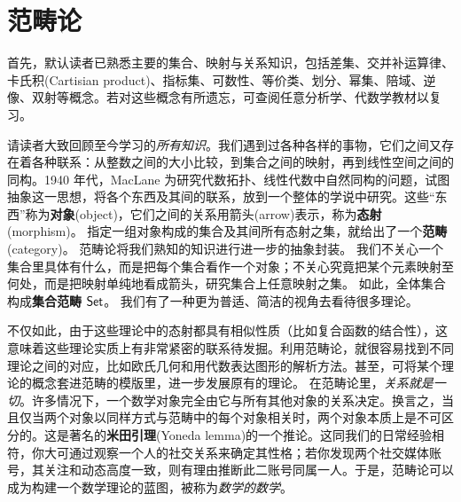 \chapter{范畴论}\label{appx:cat}
首先，默认读者已熟悉主要的集合、映射与关系知识，包括差集、交并补运算律、卡氏积(Cartisian product)、指标集、可数性、等价类、划分、幂集、陪域、逆像、双射等概念。若对这些概念有所遗忘，可查阅任意分析学、代数学教材以复习。

请读者大致回顾至今学习的\textit{所有知识}。我们遇到过各种各样的事物，它们之间又存在着各种联系：从整数之间的大小比较，到集合之间的映射，再到线性空间之间的同构。1940 年代，MacLane 为研究代数拓扑、线性代数中自然同构的问题，试图抽象这一思想，将各个东西及其间的联系，放到一个整体的学说中研究。这些“东西”称为\textbf{对象}(object)，它们之间的关系用箭头(arrow)表示，称为\textbf{态射}(morphism)。
指定一组对象构成的集合及其间所有态射之集，就给出了一个\textbf{范畴}(category)。
范畴论将我们熟知的知识进行进一步的抽象封装。
我们不关心一个集合里具体有什么，而是把每个集合看作一个对象；不关心究竟把某个元素映射至何处，而是把映射单纯地看成箭头，研究集合上任意映射之集。
如此，全体集合构成\textbf{集合范畴} $\mathsf{Set}$。
我们有了一种更为普适、简洁的视角去看待很多理论。

不仅如此，由于这些理论中的态射都具有相似性质（比如复合函数的结合性），这意味着这些理论实质上有非常紧密的联系待发掘。利用范畴论，就很容易找到不同理论之间的对应，比如欧氏几何和用代数表达图形的解析方法。甚至，可将某个理论的概念套进范畴的模版里，进一步发展原有的理论。
在范畴论里，\textit{关系就是一切}。许多情况下，一个数学对象完全由它与所有其他对象的关系决定。换言之，当且仅当两个对象以同样方式与范畴中的每个对象相关时，两个对象本质上是不可区分的。这是著名的\textbf{米田引理}(Yoneda lemma)的一个推论。这同我们的日常经验相符，你大可通过观察一个人的社交关系来确定其性格；若你发现两个社交媒体账号，其关注和动态高度一致，则有理由推断此二账号同属一人。于是，范畴论可以成为构建一个数学理论的蓝图，被称为\textit{数学的数学}。

